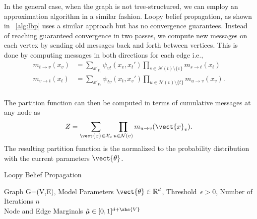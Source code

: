 

In the general case, when the graph is not tree-structured, we can employ an approximation algorithm in a similar fashion. 
Loopy belief propagation, as shown in \alg~\ref{alg:lbp} uses a similar approach but has no convergence guarantees.
Instead of reaching guaranteed convergence in two passes, we compute new messages on each vertex by sending old messages back and forth between vertices.
This is done by computing messages in both directions for each edge i.e., 
\begin{equation}
    \begin{split}
        \label{eq:mespas}
        m_{t \rightarrow v}(x_v) &= \sum_{x'_{V_t}} \psi_{vt}(x_v, x_t') \prod_{s\in \mathcal{N}(t) \setminus \{v\}} m_{s \rightarrow t}(x_t) \\
        m_{v \rightarrow t}(x_t) &= \sum_{x'_{V_v}} \psi_{tv}(x_t, x_v') \prod_{u\in \mathcal{N}(v) \setminus \{t\}} m_{u \rightarrow v}(x_v). \\
    \end{split}
\end{equation}

The partition function can then be computed in terms of cumulative messages\cite{piatkowski2018exponential} at any node as 
\begin{equation}
    Z = \sum_{\vect{x} \in \mathcal{X}_v} \prod_{u \in \mathcal{N}(v)} m_{u \rightarrow v}(\vect{x}_v).
\end{equation} 
The resulting partition function is the normalized to the probability distribution with the current parameters $\vect{\theta}$.

\begin{algo}{Loopy Belief Propagation}
    \begin{algorithm}[H]
        \caption{Loopy Belief Propagation}
        \begin{algorithmic}
            \label{alg:lbp}
            \REQUIRE Graph G=(V,E), Model Parameters $\vect{\theta} \in \mathbb{R}^d$, Threshold~$\epsilon > 0$, Number of Iterations $n$\\
            \ENSURE  Node and Edge Marginals $\hat{\mu} \in [0,1]^{d + \abs{V}}$ \\
                \\
                \ENDFOR
                \\
                \\
                \ENDIF
            \ENDFOR
        \end{algorithmic}
    \end{algorithm}
\end{algo}
